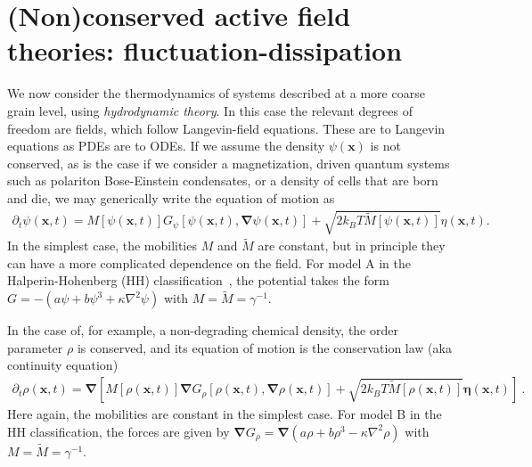 \section{(Non)conserved active field theories: fluctuation-dissipation}



We now consider the thermodynamics of systems described at a more coarse grain level, using \emph{hydrodynamic theory}. 
In this case the relevant degrees of freedom are fields, which follow Langevin-field equations.
These are to Langevin equations as PDEs are to ODEs.
If we assume the density $\psi(\bm x)$ is not conserved, as is the case if we consider a magnetization, driven quantum systems such as polariton Bose-Einstein condensates, or a density of cells that are born and die, we may generically write the equation of motion as
%
\begin{align}
    \partial_t \psi(\bm x, t) 
    = M[\psi(\bm x, t)] G_\psi[\psi(\bm x, t), \bm \nabla \psi(\bm x, t)] 
    + \sqrt{ 2 k_B T \tilde M[\psi(\bm x, t)] } \eta(\bm x, t).
\end{align}
%
In the simplest case, the mobilities $M$ and $\tilde{M}$ are constant, but in principle they can have a more complicated dependence on the field.
For model A in the Halperin-Hohenberg (HH) classification~\cite{HohenbergRMP}, the potential takes the form $G = -(a \psi + b \psi^3 + \kappa \nabla^2 \psi)$ with $M=\tilde{M}=\gamma^{-1}$. 
%

In the case of, for example, a non-degrading chemical density, the order parameter $\rho$ is conserved, and its equation of motion is the conservation law (aka continuity equation)
%
\begin{align}
    \partial_t \rho(\bm x, t)
    = 
    \bm \nabla
    \left[
        M[\rho(\bm x, t)]
        \bm \nabla G_\rho[\rho(\bm x, t), \bm \nabla\rho(\bm x, t)]
        + \sqrt{ 2 k_B T \tilde M[\rho(\bm x, t)] }
        \bm \eta(\bm x, t)
    \right]~.
\end{align}
%
Here again, the mobilities are constant in the simplest case.
For model B in the HH classification, the forces are given by $\bm \nabla G_\rho = \bm \nabla (a \rho + b \rho^3 - \kappa \nabla^2 \rho)$ with $M = \tilde{M} = \gamma^{-1}$.

